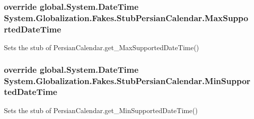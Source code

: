 \hypertarget{class_system_1_1_globalization_1_1_fakes_1_1_stub_persian_calendar_a254f090e3e0308abf86b556dd2f4f98f}{
\subsubsection[{Max\-Supported\-Date\-Time}]{\setlength{\rightskip}{0pt plus 5cm}override global.\-System.\-Date\-Time System.\-Globalization.\-Fakes.\-Stub\-Persian\-Calendar.\-Max\-Supported\-Date\-Time\hspace{0.3cm}{\ttfamily [get]}}}\label{class_system_1_1_globalization_1_1_fakes_1_1_stub_persian_calendar_a254f090e3e0308abf86b556dd2f4f98f}


Sets the stub of Persian\-Calendar.\-get\-\_\-\-Max\-Supported\-Date\-Time()

\hypertarget{class_system_1_1_globalization_1_1_fakes_1_1_stub_persian_calendar_a2e4117c4c0aef06c7517984b1477e3f3}{
\subsubsection[{Min\-Supported\-Date\-Time}]{\setlength{\rightskip}{0pt plus 5cm}override global.\-System.\-Date\-Time System.\-Globalization.\-Fakes.\-Stub\-Persian\-Calendar.\-Min\-Supported\-Date\-Time\hspace{0.3cm}{\ttfamily [get]}}}\label{class_system_1_1_globalization_1_1_fakes_1_1_stub_persian_calendar_a2e4117c4c0aef06c7517984b1477e3f3}


Sets the stub of Persian\-Calendar.\-get\-\_\-\-Min\-Supported\-Date\-Time()

